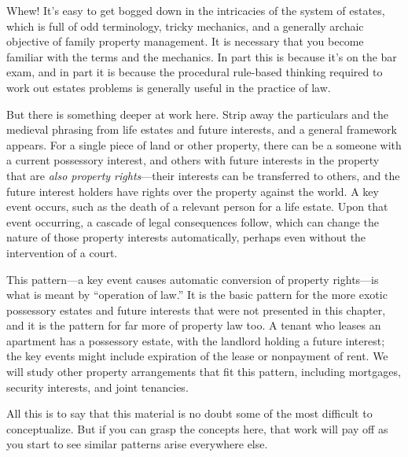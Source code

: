 Whew! It's easy to get bogged down in the intricacies of the system of estates,
which is full of odd terminology, tricky mechanics, and a generally archaic
objective of family property management. It is necessary that you become
familiar with the terms and the mechanics. In part this is because it's on the
bar exam, and in part it is because the procedural rule-based thinking required
to work out estates problems is generally useful in the practice of law.

But there is something deeper at work here. Strip away the particulars and the
medieval phrasing from life estates and future interests, and a general
framework appears. For a single piece of land or other property, there can be a
someone with a current possessory interest, and others with future interests in
the property that are \emph{also property rights}---their interests can be
transferred to others, and the future interest holders have rights over the
property against the world. A key event occurs, such as the death of a
relevant person for a life estate. Upon that event occurring, a cascade of legal
consequences follow, which can change the nature of those property interests
automatically, perhaps even without the intervention of a court.

This pattern---a key event causes automatic conversion of property
rights---is what is meant by ``operation of law.'' It is the basic pattern for
the more exotic possessory estates and future interests that were not presented
in this chapter, and it is the pattern for far more of property law too. A
tenant who leases an apartment has a possessory estate, with the landlord
holding a future interest; the key events might include expiration of the
lease or nonpayment of rent. We will study other property arrangements that fit
this pattern, including mortgages, security interests, and joint tenancies. 

All this is to say that this material is no doubt some of the most difficult to
conceptualize. But if you can grasp the concepts here, that work will pay off as
you start to see similar patterns arise everywhere else.

